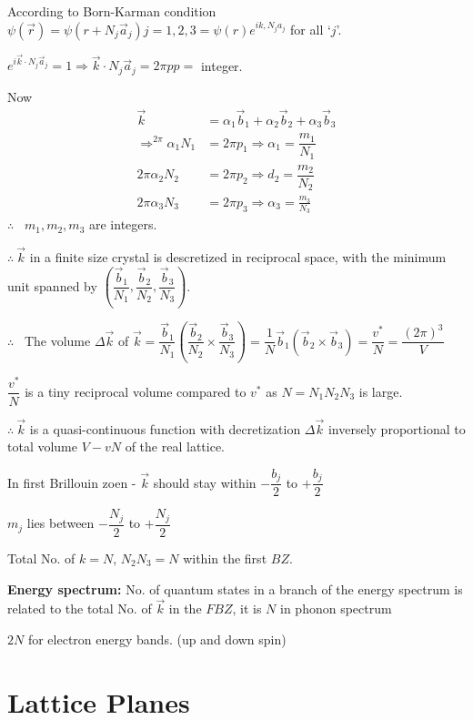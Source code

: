 According to Born-Karman condition $\psi(\overrightarrow{r})=\psi(r+N_{j}\overrightarrow{a}_{j})j=1,2,3=\psi(r)e^{ik,N_{j}a_{j}}$ for all `$j$'.

$e^{i\overrightarrow{k}\cdot N_{j}\overrightarrow{a}_{j}}=1 \Rightarrow \overrightarrow{k}\cdot N_{j}\overrightarrow{a}_{j}=2\pi p$\quad $p=$ integer.

Now 
\begin{align*}
\overrightarrow{k} &= \alpha_{1}\overrightarrow{b}_{1}+\alpha_{2}\overrightarrow{b}_{2}+\alpha_{3}\overrightarrow{b}_{3}\\
\Rightarrow^{2\pi}\alpha_{1}N_{1} &=2\pi p_{1}\Rightarrow\alpha_{1}=\dfrac{m_{1}}{N_{1}}\\
2\pi \alpha_{2}N_{2} &= 2\pi p_{2}\Rightarrow d_{2}=\dfrac{m_{2}}{N_{2}}\\
2\pi\alpha_{3}N_{3} &= 2\pi p_{3}\Rightarrow \alpha_{3}=\frac{m_{3}}{N_{3}}
\end{align*}
$\therefore$ \ \quad $m_{1},m_{2},m_{3}$ are integers.

$\therefore \ \overrightarrow{k}$ in a finite size crystal is descretized in reciprocal space, with the minimum unit spanned by $\left(\dfrac{\overrightarrow{b}_{1}}{N_{1}},\dfrac{\overrightarrow{b}_{2}}{N_{2}},\dfrac{\overrightarrow{b}_{3}}{N_{3}}\right)$.

$\therefore$ \ The volume $\Delta \overrightarrow{k}$ of $\overrightarrow{k}=\dfrac{\overrightarrow{b}_{1}}{N_{1}}\left(\dfrac{\overrightarrow{b}_{2}}{N_{2}}\times \dfrac{\overrightarrow{b}_{3}}{N_{3}}\right)=\dfrac{1}{N}\overrightarrow{b}_{1}(\overrightarrow{b}_{2}\times \overrightarrow{b}_{3})=\dfrac{v^{*}}{N}=\dfrac{(2\pi)^{3}}{V}$

$\dfrac{v^{*}}{N}$ is a tiny reciprocal volume compared to $v^{*}$ as $N=N_{1}N_{2}N_{3}$ is large.

$\therefore \ \overrightarrow{k}$ is a quasi-continuous function with decretization $\Delta \overrightarrow{k}$ inversely proportional to total volume $V-vN$ of the real lattice.

In first Brillouin zoen - $\overrightarrow{k}$ should stay within $-\dfrac{b_{j}}{2}$ to $+\dfrac{b_{j}}{2}$

$m_{j}$ lies between $-\dfrac{N_{j}}{2}$ to $+\dfrac{N_{j}}{2}$

Total No. of $k=N$, $N_{2}N_{3}=N$ within the first $BZ$.

\noindent
{\bf Energy spectrum:} No. of quantum states in a branch of the energy spectrum is related to the total No. of $\overrightarrow{k}$ in the $FBZ$, it is $N$ in phonon spectrum

$2N$ for electron energy bands. (up and down spin)

\section*{Lattice Planes}
